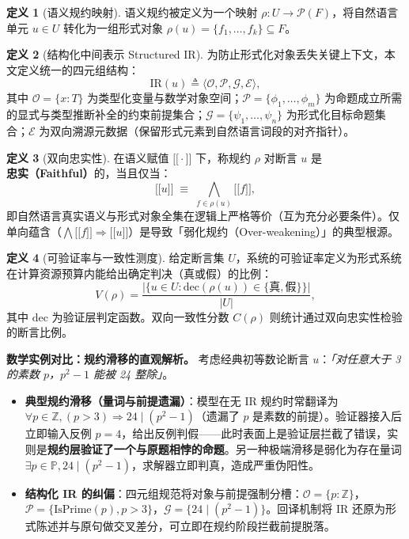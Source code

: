 ﻿\documentclass[UTF8,a4paper,11pt]{ctexart}
\theoremstyle{definition}
\newtheorem{definition}{定义}[section]
\providecommand{\llbracket}{\mathopen{[\![}}
\providecommand{\rrbracket}{\mathclose{]\!]}}
\begin{document}
\begin{definition}[语义规约映射]
语义规约被定义为一个映射 $\rho: U \to \mathcal{P}(F)$，将自然语言单元 $u \in U$ 转化为一组形式对象 $\rho(u) = \{f_1, \dots, f_k\} \subseteq F$。
\end{definition}

\begin{definition}[结构化中间表示 Structured IR]
为防止形式化对象丢失关键上下文，本文定义统一的四元组结构：
\begin{equation}
\text{IR}(u) \triangleq \langle \mathcal{O}, \mathcal{P}, \mathcal{G}, \mathcal{E} \rangle ,
\end{equation}
其中 $\mathcal{O} = \{x : T\}$ 为类型化变量与数学对象空间；$\mathcal{P} = \{\phi_1, \dots, \phi_m\}$ 为命题成立所需的显式与类型推断补全的约束前提集合；$\mathcal{G} = \{\psi_1, \dots, \psi_n\}$ 为形式化目标命题集合；$\mathcal{E}$ 为双向溯源元数据（保留形式元素到自然语言词段的对齐指针）。
\end{definition}

\begin{definition}[双向忠实性]
在语义赋值 $\llbracket\cdot\rrbracket$ 下，称规约 $\rho$ 对断言 $u$ 是\textbf{忠实（Faithful）}的，当且仅当：
\begin{equation}
\llbracket u \rrbracket \;\equiv\; \bigwedge_{f \in \rho(u)} \llbracket f \rrbracket ,
\end{equation}
即自然语言真实语义与形式对象全集在逻辑上严格等价（互为充分必要条件）。仅单向蕴含（$\bigwedge \llbracket f \rrbracket \Rightarrow \llbracket u \rrbracket$）是导致「弱化规约（Over-weakening）」的典型根源。
\end{definition}

\begin{definition}[可验证率与一致性测度]
给定断言集 $U$，系统的可验证率定义为形式系统在计算资源预算内能给出确定判决（真或假）的比例：
\begin{equation}
V(\rho) = \frac{\big|\{u \in U : \mathrm{dec}(\rho(u)) \in \{\text{真}, \text{假}\}\}\big|}{|U|} ,
\end{equation}
其中 $\mathrm{dec}$ 为验证层判定函数。双向一致性分数 $C(\rho)$ 则统计通过双向忠实性检验的断言比例。
\end{definition}

\noindent\textbf{数学实例对比：规约滑移的直观解析。} 考虑经典初等数论断言 $u$：\emph{「对任意大于 3 的素数 $p$，$p^2 - 1$ 能被 24 整除」}。
\begin{itemize}[leftmargin=1.5em,itemsep=1pt]
  \item \textbf{典型规约滑移（量词与前提遗漏）}：模型在无 IR 规约时常翻译为 $\forall p \in \mathbb{Z}, (p > 3) \Rightarrow 24 \mid (p^2 - 1)$（遗漏了 $p$ 是素数的前提）。验证器接入后立即输入反例 $p=4$，给出反例判假——此时表面上是验证层拦截了错误，实则是\textbf{规约层验证了一个与原题相悖的命题}。另一种极端滑移是弱化为存在量词 $\exists p \in \mathbb{P}, 24 \mid (p^2 - 1)$，求解器立即判真，造成严重伪阳性。
  \item \textbf{结构化 IR 的纠偏}：四元组规范将对象与前提强制分槽：$\mathcal{O} = \{p : \mathbb{Z}\}$，$\mathcal{P} = \{\mathrm{IsPrime}(p), p > 3\}$，$\mathcal{G} = \{24 \mid (p^2 - 1)\}$。回译机制将 IR 还原为形式陈述并与原句做交叉差分，可立即在规约阶段拦截前提脱落。
\end{itemize}
\end{document}
